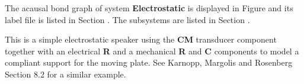 

   The acausal bond graph of system \textbf{Electrostatic} is
   displayed in Figure  and its label
   file is listed in Section .
   The subsystems are listed in Section .

This is a simple electrostatic speaker using the \textbf{CM}
transducer component together with an electrical \textbf{R} and a
mechanical \textbf{R} and \textbf{C} components to model a compliant
support for the moving plate. See Karnopp, Margolis and Rosenberg
Section 8.2 for a similar example.

